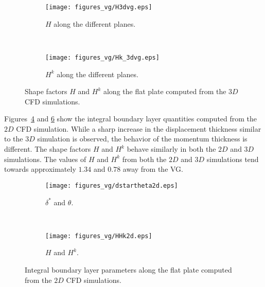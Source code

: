 \begin{figure}[h]
    \centering
    \captionsetup{justification=centering}
    \begin{subfigure}[b]{0.4\textwidth}
    \captionsetup{justification=centering}
    \centering
  \texttt{[image: figures\_vg/H3dvg.eps]}
  \caption{$H$ along the different planes.}
  \label{fig:H3dvg}
    \end{subfigure}
    ~ %
    \begin{subfigure}[b]{0.4\textwidth}
    \centering
    \captionsetup{justification=centering}
        \texttt{[image: figures\_vg/Hk\_3dvg.eps]}
        \caption{$H^k$ along the different planes.}
        \label{fig:Hk3dvg}
    \end{subfigure}
    \caption{Shape factors $H$ and $H^k$ along the flat plate computed from the $3D$ CFD simulations.}
\end{figure}

Figures~\ref{fig:dt2dvg} and \ref{fig:HHk2dvg} show the integral boundary layer quantities computed from the $2D$ CFD simulation. While a sharp increase in the displacement thickness similar to the $3D$ simulation is observed, the behavior of the momentum thickness is different. The shape factors $H$ and $H^k$ behave similarly in both the $2D$ and $3D$ simulations. The values of $H$ and $H^k$ from both the $2D$ and $3D$ simulations tend towards approximately $1.34$ and $0.78$ away from the VG.
\begin{figure}[h!]
    \centering
    \captionsetup{justification=centering}
    \begin{subfigure}[b]{0.4\textwidth}
    \captionsetup{justification=centering}
    \centering
  \texttt{[image: figures\_vg/dstartheta2d.eps]}
  \caption{$\delta^{\ast}$ and $\theta$.}
  \label{fig:dt2dvg}
    \end{subfigure}
    ~ %
    \begin{subfigure}[b]{0.4\textwidth}
    \centering
    \captionsetup{justification=centering}
        \texttt{[image: figures\_vg/HHk2d.eps]}
        \caption{$H$ and $H^k$.}
        \label{fig:HHk2dvg}
    \end{subfigure}
    \caption{Integral boundary layer parameters along the flat plate computed from the $2D$ CFD simulations.}
\end{figure}

